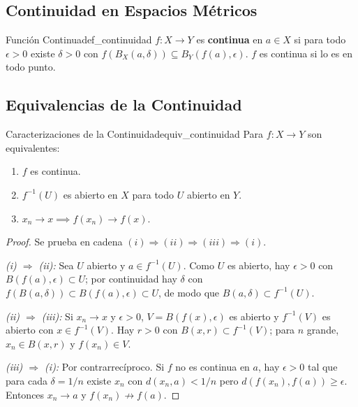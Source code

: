\documentclass[11pt, a4paper]{article}
\begin{document}
\subsection{Continuidad en Espacios Métricos}

\begin{definicion}{Función Continua}{def_continuidad}
$f: X \to Y$ es \textbf{continua} en $a \in X$ si para todo $\epsilon > 0$ existe $\delta > 0$ con
$f(B_X(a, \delta)) \subseteq B_Y(f(a), \epsilon)$. $f$ es continua si lo es en todo punto.
\end{definicion}

\subsection{Equivalencias de la Continuidad}

\begin{teorema}{Caracterizaciones de la Continuidad}{equiv_continuidad}
Para $f: X \to Y$ son equivalentes:
\begin{enumerate}
    \item[i)] $f$ es continua.
    \item[ii)] $f^{-1}(U)$ es abierto en $X$ para todo $U$ abierto en $Y$.
    \item[iii)] $x_n \to x \implies f(x_n) \to f(x)$.
\end{enumerate}
\end{teorema}

\begin{proof}
Se prueba en cadena $(i) \Rightarrow (ii) \Rightarrow (iii) \Rightarrow (i)$.

\textit{(i) $\Rightarrow$ (ii):} Sea $U$ abierto y $a \in f^{-1}(U)$. Como $U$ es abierto, hay
$\epsilon > 0$ con $B(f(a), \epsilon) \subset U$; por continuidad hay $\delta$ con
$f(B(a, \delta)) \subset B(f(a), \epsilon) \subset U$, de modo que $B(a, \delta) \subset f^{-1}(U)$.

\textit{(ii) $\Rightarrow$ (iii):} Si $x_n \to x$ y $\epsilon > 0$, $V = B(f(x), \epsilon)$ es
abierto y $f^{-1}(V)$ es abierto con $x \in f^{-1}(V)$. Hay $r > 0$ con $B(x, r) \subset f^{-1}(V)$;
para $n$ grande, $x_n \in B(x, r)$ y $f(x_n) \in V$.

\textit{(iii) $\Rightarrow$ (i):} Por contrarrecíproco. Si $f$ no es continua en $a$, hay
$\epsilon > 0$ tal que para cada $\delta = 1/n$ existe $x_n$ con $d(x_n, a) < 1/n$ pero
$d(f(x_n), f(a)) \ge \epsilon$. Entonces $x_n \to a$ y $f(x_n) \not\to f(a)$.
\end{proof}
\end{document}
